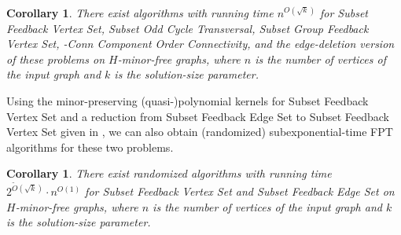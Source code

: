 \documentclass[a4paper,11pt]{article}
\numberwithin{lemma}{section}
\newtheorem{corollary}[lemma]{Corollary}
\begin{document}
\begin{corollary}
 There exist algorithms with running time $n^{O(\sqrt{k})}$ for {\sc Subset Feedback Vertex Set}, {\sc Subset Odd Cycle Transversal}, {\sc Subset Group Feedback Vertex Set}, {-Conn Component Order Connectivity}, and the edge-deletion version of these problems on $H$-minor-free graphs, where $n$ is the number of vertices of the input graph and $k$ is the solution-size parameter.
\end{corollary}

Using the minor-preserving (quasi-)polynomial kernels for {\sc Subset Feedback Vertex Set} and a reduction from {\sc Subset Feedback Edge Set} to  {\sc Subset Feedback Vertex Set} given in \cite{MarxMNT22}, we can also obtain (randomized) subexponential-time FPT algorithms for these two problems.

\begin{corollary}
 There exist randomized algorithms with running time $2^{\widetilde{O}(\sqrt{k})} \cdot n^{O(1)}$ for {\sc Subset Feedback Vertex Set} and {\sc Subset Feedback Edge Set} on $H$-minor-free graphs, where $n$ is the number of vertices of the input graph and $k$ is the solution-size parameter.
\end{corollary}
 



\end{document}
